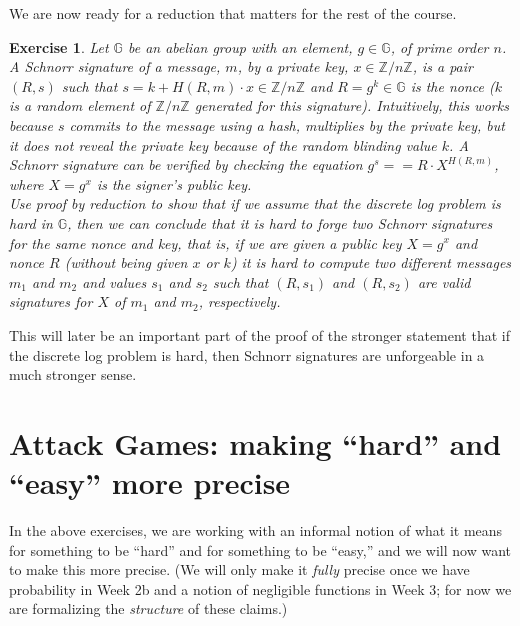 \documentclass[12pt]{article}
\newcommand{\Z}[0]{\mathbb{Z}}
\newcommand{\G}[0]{\mathbb{G}}
\newtheorem{exercise}{Exercise}
\theoremstyle{definition}
\theoremstyle{remark}
\theoremstyle{definition}
\begin{document}
We are now ready for a reduction that matters for the rest of the course.

\begin{exercise}\label{ex:nonce-reuse}
Let $\G$ be an abelian group with an element, $g\in\G$, of prime order $n$. A Schnorr signature of a message, $m$, by a private key, $x\in\Z/n\Z$, is a pair $(R, s)$ such that $s = k + H(R, m)\cdot x\in \Z/n\Z$ and $R = g^k\in\G$ is the nonce ($k$ is a random element of $\Z/n\Z$ generated for this signature). Intuitively, this works because $s$ commits to the message using a hash, multiplies by the private key, but it does not reveal the private key because of the random blinding value $k$. A Schnorr signature can be verified by checking the equation $g^s == R\cdot X^{H(R, m)}$, where $X = g^x$ is the signer's public key.\\
Use proof by reduction to show that if we assume that the discrete log problem is hard in $\G$, then we can conclude that it is hard to forge two Schnorr signatures for the same nonce and key, that is, if we are given a public key $X = g^x$ and nonce $R$ (without being given $x$ or $k$) it is hard to compute two different messages $m_1$ and $m_2$ and values $s_1$ and $s_2$ such that $(R, s_1)$ and $(R, s_2)$ are valid signatures for $X$ of $m_1$ and $m_2$, respectively.
\end{exercise}

This will later be an important part of the proof of the stronger statement that if the discrete log problem is hard, then Schnorr signatures are unforgeable in a much stronger sense.

\section*{Attack Games: making ``hard'' and ``easy'' more precise}

In the above exercises, we are working with an informal notion of what it means for something to be ``hard'' and for something to be ``easy,'' and we will now want to make this more precise. (We will only make it \emph{fully} precise once we have probability in Week 2b and a notion of negligible functions in Week 3; for now we are formalizing the \emph{structure} of these claims.)\\
\end{document}
